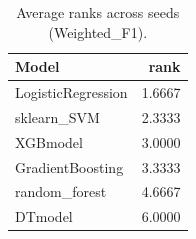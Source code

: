 \begin{table}[t]
\centering
\begin{tabular}{lr}
\toprule
Model & rank \\
\midrule
LogisticRegression & 1.6667 \\
sklearn_SVM & 2.3333 \\
XGBmodel & 3.0000 \\
GradientBoosting & 3.3333 \\
random_forest & 4.6667 \\
DTmodel & 6.0000 \\
\bottomrule
\end{tabular}
\caption{Average ranks across seeds (Weighted_F1).}
\label{tab:avg_rank_Weighted_F1}
\end{table}